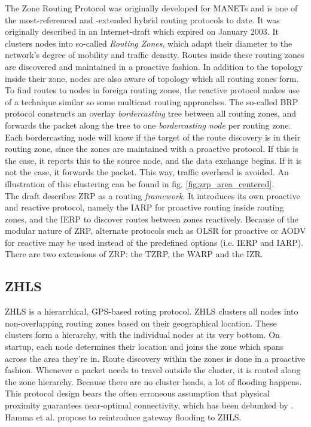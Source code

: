 \documentclass[a4paper,10pt]{scrartcl}
\begin{document}
The Zone Routing Protocol was originally developed for \glspl{MANET} and is one of the most-referenced and -extended hybrid routing protocols to date. It was originally described in an Internet-draft which expired on January 2003\cite{ZRP-Draft}.
It clusters nodes into so-called \emph{Routing Zones}, which adapt their diameter to the network's degree of mobility and traffic density. Routes inside these routing zones are discovered and maintained in a proactive fashion. In addition to the topology inside their zone, nodes are also aware of topology which all routing zones form.
To find routes to nodes in foreign routing zones, the reactive protocol makes use of a technique similar so some multicast routing approaches. The so-called \gls{BRP}\cite{draft-ietf-manet-zone-brp} protocol constructs an overlay \emph{bordercasting} tree between all routing zones, and forwards the packet along the tree to one \emph{bordercasting node} per routing zone. Each bordercasting node will know if the target of the route discovery is in their routing zone, since the zones are maintained with a proactive protocol. If this is the case, it reports this to the source node, and the data exchange begins. If it is not the case, it forwards the packet. This way, traffic overhead is avoided. An illustration of this clustering can be found in fig. \ref{fig:zrp_area_centered}.\\
The draft describes ZRP as a routing \emph{framework}. It introduces its own proactive and reactive protocol, namely the \gls{IARP}\cite{draft-ietf-manet-zone-iarp} for proactive routing inside routing zones, and the \gls{IERP}\cite{draft-ietf-manet-zone-ierp} to discover routes between zones reactively. Because of the modular nature of ZRP, alternate protocols such as OLSR for proactive or AODV for reactive may be used instead of the predefined options (i.e. IERP and IARP).\\
There are two extensions of ZRP: the \gls{TZRP}\cite{TZRP}, the \gls{WARP}\cite{WARP} and the \gls{IZR}\cite{IZR}.

\subsection{\gls{ZHLS}}
\label{subsec:zhls}
ZHLS is a hierarchical, GPS-based roting protocol.
ZHLS clusters all nodes into non-overlapping routing zones based on their geographical location. These clusters form a hierarchy, with the individual nodes at its very bottom.
On startup, each node determines their location and joins the zone which spans across the area they're in. Route discovery within the zones is done in a proactive fashion. Whenever a packet needs to travel outside the cluster, it is routed along the zone hierarchy. Because there are no cluster heads, a lot of flooding happens. 
This protocol design bears the often erroneous assumption that physical proximity guarantees near-optimal connectivity, which has been debunked by \cite{mistaken-axioms}. 
Hamma et al.\cite{ZHLS-GF} propose to reintroduce gateway flooding to ZHLS.
\end{document}
